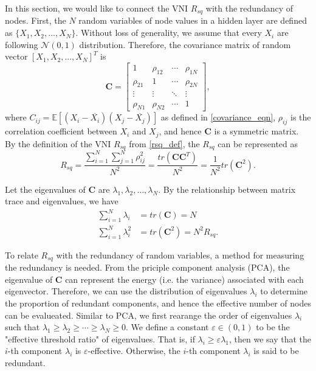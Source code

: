 In this section, we would like to connect the VNI $R_{sq}$ with the redundancy of nodes.
First, the $N$ random variables of node values in a hidden layer are defined as $\{X_1, X_2, ..., X_N\}$.
Without loss of generality, we assume that every $X_i$ are following $\mathcal{N}(0, 1)$ distribution.
Therefore, the covariance matrix of random vector $[X_1, X_2, ..., X_N]^T$ is
\begin{equation}
    \mathbf{C}=
    \begin{bmatrix}
        1 & \rho_{12} & \cdots & \rho_{1N} \\
        \rho_{21} & 1 & \cdots & \rho_{2N} \\
        \vdots & \vdots & \ddots & \vdots  \\
        \rho_{N1} & \rho_{N2} & \cdots & 1
    \end{bmatrix},
    \label{rv_cov}
\end{equation}
where $C_{ij}=\mathbb{E}[(X_i-\overline{X_i})(X_j-\overline{X_j})]$ as defined in
\eqref{covariance_eqn}, $\rho_{ij}$ is the correlation coefficient between $X_i$ and $X_j$,
and hence $\mathbf{C}$ is a symmetric matrix.
By the definition of the VNI $R_{sq}$ from \eqref{rsq_def}, the $R_{sq}$
can be represented as
\begin{equation}
    R_{sq}=\frac{\sum_{i=1}^N\sum_{j=1}^N\rho_{ij}^2}{N^2}
    =\frac{tr(\mathbf{C}\mathbf{C}^T)}{N^2}=\frac{1}{N^2}tr(\mathbf{C}^2).
    \label{rv_rsq}
\end{equation}

Let the eigenvalues of $\mathbf{C}$ are $\lambda_1, \lambda_2, \dots, \lambda_N$.
By the relationship between matrix trace and eigenvalues, we have
\begin{equation}
    \begin{aligned}
        \sum_{i=1}^N\lambda_i&=tr(\mathbf{C})=N\\
    \sum_{i=1}^N\lambda_i^2&=tr(\mathbf{C}^2)=N^2R_{sq}.
    \end{aligned}
    \label{rv_eigen}
\end{equation}

To relate $R_{sq}$ with the redundancy of random variables, a method for measuring the redundancy
is needed.
From the priciple component analysis (PCA), the eigenvalue of $\mathbf{C}$ can represent the 
energy (i.e. the variance) associated with each eigenvector.
Therefore, we can use the distribution of eigenvalues $\lambda_i$ to determine the proportion of
redundant components, and hence the effective number of nodes can be evalueated.
Similar to PCA, we first rearange the order of eigenvalues $\lambda_i$ such that
$\lambda_1\geq\lambda_2\geq\cdots\geq\lambda_N\geq 0$.
We define a constant $\varepsilon\in(0, 1)$ to be the "effective threshold ratio" of eigenvalues.
That is, if $\lambda_i \geq \varepsilon\lambda_1$, then we say that the $i$-th component $\lambda_i$ is
$\varepsilon$-effective.
Otherwise, the $i$-th component $\lambda_i$ is said to be redundant.

